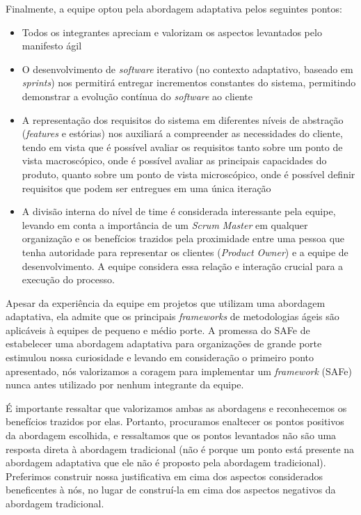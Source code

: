 Finalmente, a equipe optou pela abordagem adaptativa pelos seguintes pontos:
\begin{itemize}
\item Todos os integrantes apreciam e valorizam os aspectos levantados pelo manifesto ágil

\item O desenvolvimento de \emph{software} iterativo (no contexto adaptativo, baseado em \emph{sprints}) nos permitirá entregar incrementos constantes do sistema, permitindo demonstrar a evolução contínua do \emph{software} ao cliente

\item A representação dos requisitos do sistema em diferentes níveis de abstração (\emph{features} e estórias) nos auxiliará a compreender as necessidades do cliente, tendo em vista que é possível avaliar os requisitos tanto sobre um ponto de vista macroscópico, onde é possível avaliar as principais capacidades do produto, quanto sobre um ponto de vista microscópico, onde é possível definir requisitos que podem ser entregues em uma única iteração

\item A divisão interna do nível de time é considerada interessante pela equipe, levando em conta a importância de um \emph{Scrum Master} em qualquer organização e os benefícios trazidos pela proximidade entre uma pessoa que tenha autoridade para representar os clientes (\emph{Product Owner}) e a equipe de desenvolvimento. A equipe considera essa relação e interação crucial para a execução do processo.
\end{itemize}

Apesar da experiência da equipe em projetos que utilizam uma abordagem adaptativa, ela admite que os principais \emph{frameworks} de metodologias ágeis são aplicáveis à equipes de pequeno e médio porte. A promessa do SAFe de estabelecer uma abordagem adaptativa para organizações de grande porte estimulou nossa curiosidade e levando em consideração o primeiro ponto apresentado, nós valorizamos a coragem para implementar um \emph{framework} (SAFe) nunca antes utilizado por nenhum integrante da equipe.

É importante ressaltar que valorizamos ambas as abordagens e reconhecemos os benefícios trazidos por elas. Portanto, procuramos enaltecer os pontos positivos da abordagem escolhida, e ressaltamos que os pontos levantados não são uma resposta direta à abordagem tradicional (não é porque um ponto está presente na abordagem adaptativa que ele não é proposto pela abordagem tradicional). Preferimos construir nossa justificativa em cima dos aspectos considerados beneficentes à nós, no lugar de construí-la em cima dos aspectos negativos da abordagem tradicional.
